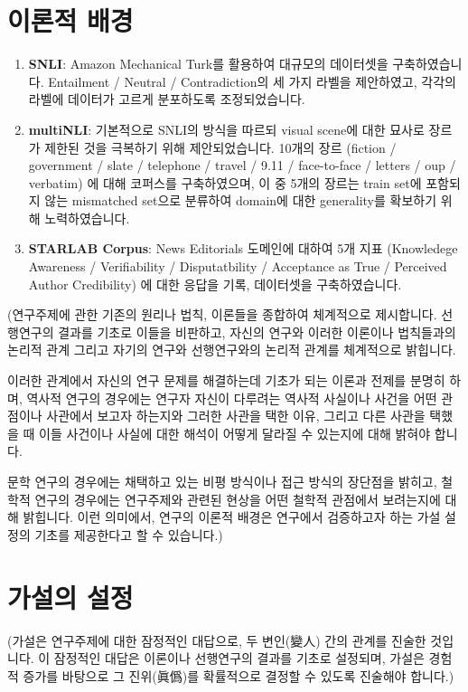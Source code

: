 \documentclass{article}
\begin{document}
\section{이론적 배경}
\begin{enumerate}
  \item \textbf{SNLI}: 
    Amazon Mechanical Turk를 활용하여 대규모의 데이터셋을 구축하였습니다.
    Entailment / Neutral / Contradiction의 세 가지 라벨을 제안하였고,
    각각의 라벨에 데이터가 고르게 분포하도록 조정되었습니다.
  \item \textbf{multiNLI}:
    기본적으로 SNLI의 방식을 따르되 visual scene에 대한 묘사로 장르가 제한된 것을
    극복하기 위해 제안되었습니다. 10개의 장르
    (fiction / government / slate / telephone / travel / 9.11 / face-to-face / letters / oup / verbatim)
    에 대해 코퍼스를 구축하였으며, 이 중 5개의 장르는 train set에 포함되지 않는 mismatched set으로 분류하여
    domain에 대한 generality를 확보하기 위해 노력하였습니다.
  \item \textbf{STARLAB Corpus}:
    News Editorials 도메인에 대하여 5개 지표
    (Knowledege Awareness / Verifiability / Disputatbility / Acceptance as True / Perceived Author Credibility)
    에 대한 응답을 기록, 데이터셋을 구축하였습니다. 
\end{enumerate}

(연구주제에 관한 기존의 원리나 법칙,
이론들을 종합하여 체계적으로 제시합니다.
선행연구의 결과를 기초로 이들을 비판하고, 자신의 연구와
이러한 이론이나 법칙들과의 논리적 관계 그리고 자기의 연구와
선행연구와의 논리적 관계를 체계적으로 밝힙니다.

이러한 관계에서 자신의 연구 문제를 해결하는데 기초가 되는
이론과 전제를 분명히 하며, 역사적 연구의 경우에는
연구자 자신이 다루려는 역사적 사실이나 사건을 어떤 관점이나
사관에서 보고자 하는지와 그러한 사관을 택한 이유,
그리고 다른 사관을 택했을 때 이들 사건이나 사실에 대한
해석이 어떻게 달라질 수 있는지에 대해 밝혀야 합니다.

문학 연구의 경우에는 채택하고 있는 비평 방식이나
접근 방식의 장단점을 밝히고, 철학적 연구의 경우에는
연구주제와 관련된 현상을 어떤 철학적 관점에서 보려는지에
대해 밝힙니다. 이런 의미에서, 연구의 이론적 배경은 연구에서
검증하고자 하는 가설 설정의 기초를 제공한다고 할 수 있습니다.)

\section{가설의 설정} 
(가설은 연구주제에 대한 잠정적인 대답으로,
두 변인(變人) 간의 관계를 진술한 것입니다. 
이 잠정적인 대답은 이론이나 선행연구의 결과를 기초로 설정되며,
가설은 경험적 증가를 바탕으로 그 진위(眞僞)를 확률적으로
결정할 수 있도록 진술해야 합니다.)
\end{document}
